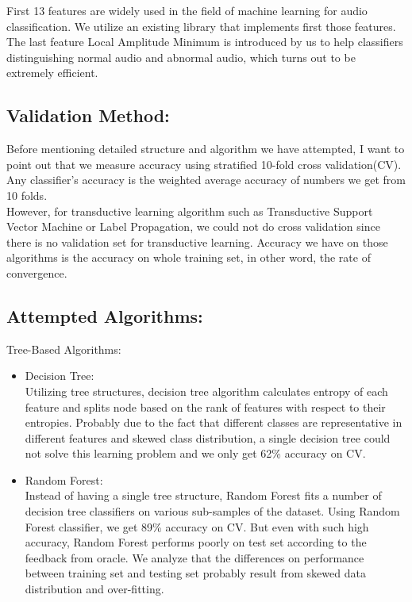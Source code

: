 First 13 features are widely used in the field of machine learning for audio classification. We utilize an existing library\cite{b6} that implements first those features. The last feature Local Amplitude Minimum is introduced by us to help classifiers distinguishing normal audio and abnormal audio, which turns out to be extremely efficient. \\
\subsection{Validation Method:}
Before mentioning detailed structure and algorithm we have attempted, I want to point out that we measure accuracy using stratified 10-fold cross validation(CV). Any classifier's accuracy is the weighted average accuracy of numbers we get from 10 folds.  \\
\indent However, for transductive learning algorithm such as Transductive Support Vector Machine or Label Propagation, we could not do cross validation since there is no validation set for transductive learning. Accuracy we have on those algorithms is the accuracy on whole training set, in other word, the rate of convergence. 
\subsection{Attempted Algorithms:}
Tree-Based Algorithms:
\begin{itemize}
	\item Decision Tree:\\
	Utilizing tree structures, decision tree algorithm calculates entropy of each feature and splits node based on the rank of features with respect to their entropies. Probably due to the fact that different classes are representative in different features and skewed class distribution, a single decision tree could not solve this learning problem and we only get 62\% accuracy on CV.\\
	\item Random Forest:\\
	Instead of having a single tree structure, Random Forest fits a number of decision tree classifiers on various sub-samples of the dataset.\cite{b7} Using Random Forest classifier, we get 89\% accuracy on CV. But even with such high accuracy, Random Forest performs poorly on test set according to the feedback from oracle. We analyze that the differences on performance between training set and testing set probably result from skewed data distribution and over-fitting. \\
\end{itemize}

